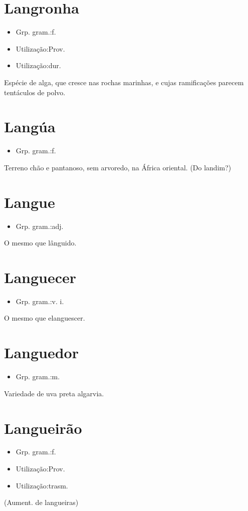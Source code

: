 \section{Langronha}
\begin{itemize}
\item {Grp. gram.:f.}
\end{itemize}
\begin{itemize}
\item {Utilização:Prov.}
\end{itemize}
\begin{itemize}
\item {Utilização:dur.}
\end{itemize}
Espécie de alga, que cresce nas rochas marinhas, e cujas ramificações parecem tentáculos de polvo.
\section{Langúa}
\begin{itemize}
\item {Grp. gram.:f.}
\end{itemize}
Terreno chão e pantanoso, sem arvoredo, na África oriental.
(Do landim?)
\section{Langue}
\begin{itemize}
\item {Grp. gram.:adj.}
\end{itemize}
O mesmo que \textunderscore lânguido\textunderscore .
\section{Languecer}
\begin{itemize}
\item {Grp. gram.:v. i.}
\end{itemize}
O mesmo que \textunderscore elanguescer\textunderscore .
\section{Languedor}
\begin{itemize}
\item {Grp. gram.:m.}
\end{itemize}
Variedade de uva preta algarvia.
\section{Langueirão}
\begin{itemize}
\item {Grp. gram.:f.}
\end{itemize}
\begin{itemize}
\item {Utilização:Prov.}
\end{itemize}
\begin{itemize}
\item {Utilização:trasm.}
\end{itemize}
(Aument. de \textunderscore langueiras\textunderscore )
